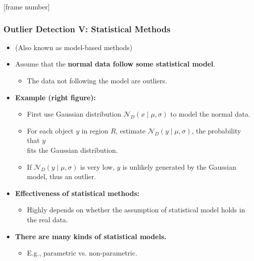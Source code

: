 \documentclass[aspectratio=169,t,xcolor=dvipsnames]{beamer}
\begin{document}
{
[frame number]
\begin{frame}
	\frametitle{Outlier Detection V: Statistical Methods}
	\begin{itemize}
		\item (Also known as model-based methods)
		\item Assume that the \textbf{\color{airforceblue}normal data follow some statistical model}.
		      \begin{itemize}
		      	\item The data not following the model are outliers.
		      \end{itemize}
		\item \textbf{Example (right figure):}
		      \begin{itemize}
		      	\item First use Gaussian distribution $\mathcal{N}_D(x \; \vert \; \mu,\sigma)$ to model the normal data.
		      	\item For each object $y$ in region $R$, estimate $\mathcal{N}_D(y \; \vert \; \mu, \sigma)$, the probability that $y$ \\
            fits the Gaussian distribution.
		      	\item If $\mathcal{N}_D(y \; \vert \; \mu, \sigma)$ is very low, $y$ is unlikely generated by the Gaussian model, thus an outlier.
		      \end{itemize}
		\item\textbf{Effectiveness of statistical methods:}
		      \begin{itemize}
		      	\item Highly depends on whether the assumption of statistical model holds in the real data.
		      \end{itemize}
		\item \textbf{There are many kinds of statistical models.}
		      \begin{itemize}
		      	\item E.g., parametric vs. non-parametric.
		      \end{itemize}
	\end{itemize}


\end{frame}}
\end{document}
